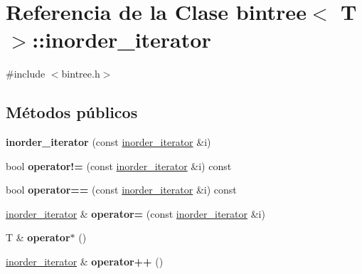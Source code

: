 \hypertarget{classbintree_1_1inorder__iterator}{}\section{Referencia de la Clase bintree$<$ T $>$\+:\+:inorder\+\_\+iterator}
\label{classbintree_1_1inorder__iterator}


{\ttfamily \#include $<$bintree.\+h$>$}

\subsection*{Métodos públicos}
\begin{DoxyCompactItemize}
\item 
{\bfseries inorder\+\_\+iterator} (const \hyperlink{classbintree_1_1inorder__iterator}{inorder\+\_\+iterator} \&i)\hypertarget{classbintree_1_1inorder__iterator_ae17ab42841cae123a3eff9a5ef076729}{}\label{classbintree_1_1inorder__iterator_ae17ab42841cae123a3eff9a5ef076729}

\item 
bool {\bfseries operator!=} (const \hyperlink{classbintree_1_1inorder__iterator}{inorder\+\_\+iterator} \&i) const \hypertarget{classbintree_1_1inorder__iterator_a6f14a4225a48b4a6f25f5ca39807d0ae}{}\label{classbintree_1_1inorder__iterator_a6f14a4225a48b4a6f25f5ca39807d0ae}

\item 
bool {\bfseries operator==} (const \hyperlink{classbintree_1_1inorder__iterator}{inorder\+\_\+iterator} \&i) const \hypertarget{classbintree_1_1inorder__iterator_a10fb31268e741d7ac94da75d934d9683}{}\label{classbintree_1_1inorder__iterator_a10fb31268e741d7ac94da75d934d9683}

\item 
\hyperlink{classbintree_1_1inorder__iterator}{inorder\+\_\+iterator} \& {\bfseries operator=} (const \hyperlink{classbintree_1_1inorder__iterator}{inorder\+\_\+iterator} \&i)\hypertarget{classbintree_1_1inorder__iterator_ab2ccf194ba30696c8c0a39b856f0456b}{}\label{classbintree_1_1inorder__iterator_ab2ccf194ba30696c8c0a39b856f0456b}

\item 
T \& {\bfseries operator$\ast$} ()\hypertarget{classbintree_1_1inorder__iterator_a9fabb11c1557118623e645cde49122e3}{}\label{classbintree_1_1inorder__iterator_a9fabb11c1557118623e645cde49122e3}

\item 
\hyperlink{classbintree_1_1inorder__iterator}{inorder\+\_\+iterator} \& {\bfseries operator++} ()\hypertarget{classbintree_1_1inorder__iterator_a7363f5ccd154e848a0fb379a54df61a5}{}\label{classbintree_1_1inorder__iterator_a7363f5ccd154e848a0fb379a54df61a5}

\end{DoxyCompactItemize}

